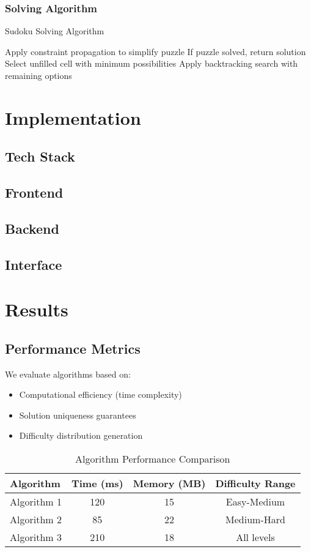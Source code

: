 \documentclass[12pt,a4paper]{article}
\begin{document}
\subsubsection{Solving Algorithm}
\begin{algorithm}
\caption{Sudoku Solving Algorithm}
\begin{algorithmic}[1]
\State Apply constraint propagation to simplify puzzle
\State If puzzle solved, return solution
\State Select unfilled cell with minimum possibilities
\State Apply backtracking search with remaining options
\end{algorithmic}
\end{algorithm}

\section{Implementation}
\subsection{Tech Stack}
\subsection{Frontend}
\subsection{Backend}
\subsection{Interface}

\section{Results}
\subsection{Performance Metrics}
We evaluate algorithms based on:
\begin{itemize}
    \item Computational efficiency (time complexity)
    \item Solution uniqueness guarantees
    \item Difficulty distribution generation
\end{itemize}

\begin{table}[h]
\centering
\caption{Algorithm Performance Comparison}
\begin{tabular}{lccc}
\toprule
Algorithm & Time (ms) & Memory (MB) & Difficulty Range \\
\midrule
Algorithm 1 & 120 & 15 & Easy-Medium \\
Algorithm 2 & 85 & 22 & Medium-Hard \\
Algorithm 3 & 210 & 18 & All levels \\
\bottomrule
\end{tabular}
\end{table}
\end{document}
